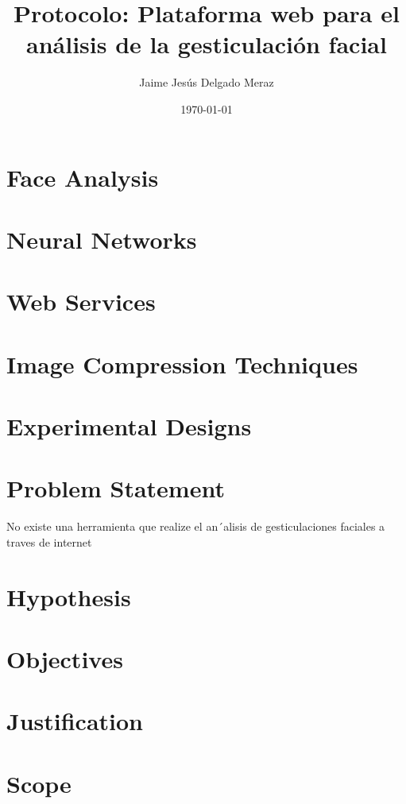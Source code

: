 \documentclass[11pt,letterpaper]{article}
\author{Jaime Jesús Delgado Meraz}
\title{Protocolo: Plataforma web para el análisis de la gesticulación facial}
\date{\today}
\begin{document}
\maketitle
\clearpage
\setlength{\parskip}{0mm}
\tableofcontents
\listoftables
\clearpage
\setlength{\parskip}{5mm}


\section{Face Analysis}
	
\section{Neural Networks}
	
\section{Web Services}
	
\section{Image Compression Techniques}
\section{Experimental Designs}

\section{Problem Statement}
No existe una herramienta que realize el an´alisis de gesticulaciones faciales a traves de internet
\section{Hypothesis}
\section{Objectives}
\section{Justification}
\section{Scope}
\newpage
\printglossaries


\newpage


\end{document}
